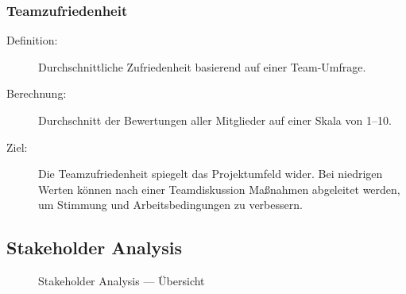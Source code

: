 \documentclass{article}
\begin{document}
\subsubsection{Teamzufriedenheit}
\begin{description}
  \item[Definition:] Durchschnittliche Zufriedenheit basierend auf einer Team-Umfrage.
  \item[Berechnung:] Durchschnitt der Bewertungen aller Mitglieder auf einer Skala von 1--10.
  \item[Ziel:] Die Teamzufriedenheit spiegelt das Projektumfeld wider. Bei niedrigen Werten können nach einer Teamdiskussion Maßnahmen abgeleitet werden, um Stimmung und Arbeitsbedingungen zu verbessern.
\end{description}




\subsection{Stakeholder Analysis}

\begin{figure}[H]
  \centering
  
  \caption{Stakeholder Analysis — Übersicht}
  \label{fig:swot-produkt}
\end{figure}
\end{document}

